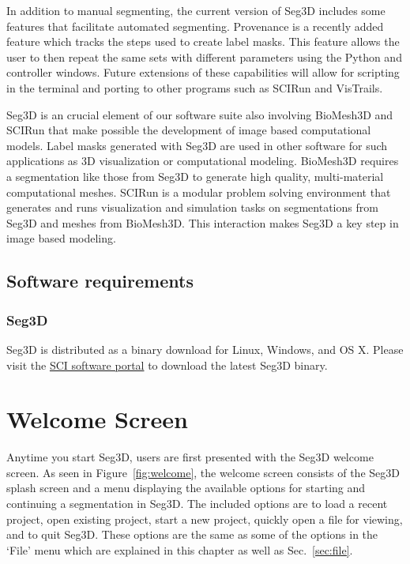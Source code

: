 \documentclass[fleqn,11pt,openany]{book}
\begin{document}
In addition to manual segmenting, the current version of Seg3D includes some features that facilitate automated segmenting.  Provenance is a recently added feature which tracks the steps used to create label masks.  This feature allows the user to then repeat the same sets with different parameters using the Python and controller windows.  Future extensions of these capabilities will allow for scripting in the terminal and porting to other programs such as SCIRun and VisTrails.

Seg3D is an crucial element of our software suite also involving BioMesh3D and SCIRun that make possible the development of image based computational models.  Label masks generated with Seg3D are used in other software  for such applications as 3D visualization or computational modeling.  BioMesh3D requires a segmentation like those from Seg3D to generate high quality, multi-material computational meshes.  SCIRun is a modular problem solving environment that generates and runs visualization and simulation tasks on segmentations from Seg3D and meshes from BioMesh3D.  This interaction makes Seg3D a key step in image based modeling.

\section{Software requirements}

\subsection{Seg3D \SegthreeDVersion}

Seg3D is distributed as a binary download for Linux, Windows, and OS X. Please visit the \href{http://www.seg3d.org}{SCI software portal} to download the latest Seg3D binary. 



\chapter{Welcome Screen}
\label{sec:welcome}

\begin{introduction}
Anytime you start Seg3D, users are first presented with the Seg3D welcome screen.  As seen in Figure~\ref{fig:welcome}, the welcome screen consists of the Seg3D splash screen and a menu displaying the available options for starting and continuing a segmentation in Seg3D.  The included options are to load a recent project, open existing project, start a new project, quickly open a file for viewing, and to quit Seg3D.  These options are the same as some of the options in the `File' menu which are explained in this chapter as well as Sec.~\ref{sec:file}.
\end{introduction}
\end{document}
